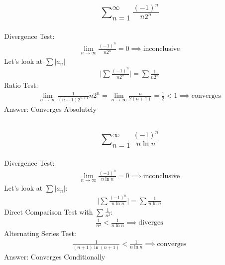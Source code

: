 \documentclass{article}
\begin{document}
\subsection{
	\begin{align*}
		\sum_{n = 1}^\infty \frac{(-1)^n}{n 2^n}
	\end{align*}
}
Divergence Test:
\begin{align*}
	\lim_{n \to \infty} {\frac{(-1)^n}{n 2^n}} = 0 \implies \text{inconclusive}
\end{align*}
Let's look at $\sum |a_n|$
\begin{align*}
	\bigg| \sum \frac{(-1)^n}{n 2^n} \bigg| = \sum \frac{1}{n 2^n}
\end{align*}
Ratio Test:
\begin{align*}
	\lim_{n \to \infty} \frac{1}{(n + 1)2^{n + 1}} n 2^n = \lim_{n \to \infty} \frac{n}{2(n + 1)} = \frac{1}{2} < 1 \implies \text{converges}
\end{align*}
Answer: Converges Absolutely

\subsection{
	\begin{align*}
		\sum_{n = 1}^\infty \frac{(-1)^n}{n \ln{n}}
	\end{align*}
}
Divergence Test:
\begin{align*}
	\lim_{n \to \infty} \frac{(-1)^n}{n \ln{n}} = 0 \implies \text{inconclusive}
\end{align*}
Let's look at $\sum |a_n|$:
\begin{align*}
	\bigg| \sum \frac{(-1)^n}{n \ln{n}} \bigg| = \sum \frac{1}{n \ln{n}}
\end{align*}
Direct Comparison Test with $\sum \frac{1}{n^2}$:
\begin{align*}
	\frac{1}{n^2} < \frac{1}{n \ln{n}} \implies \text{diverges}
\end{align*}
Alternating Series Test:
\begin{align*}
	\frac{1}{(n + 1) \ln{(n + 1)}} < \frac{1}{n \ln{n}} \implies \text{converges}
\end{align*}
Answer: Converges Conditionally
\end{document}
